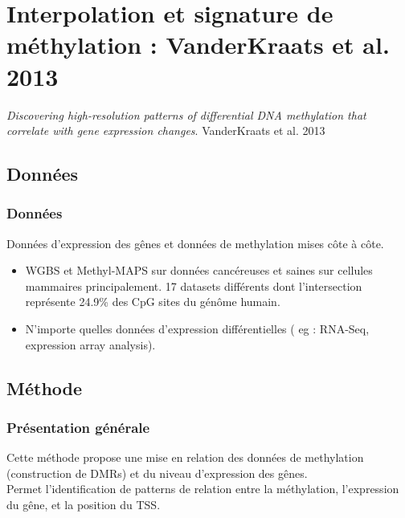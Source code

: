 \documentclass{beamer}
\begin{document}
\section{Interpolation et signature de méthylation : VanderKraats et al. 2013}
\begin{frame}
\begin{center}
\textit{Discovering high-resolution patterns of differential DNA methylation that correlate with gene expression changes}. VanderKraats et al. 2013
\end{center}
\end{frame}


\subsection{Données}
\begin{frame}
\frametitle{Données}
Données d'expression des gênes et données de methylation mises côte à côte.
\begin{itemize}
\item WGBS et Methyl-MAPS sur données cancéreuses et saines sur cellules mammaires principalement. 17 datasets différents dont l'intersection représente 24.9\% des CpG sites du génôme humain.
\item N'importe quelles données d'expression différentielles ( eg : RNA-Seq, expression array analysis).
\end{itemize}
\end{frame}

\subsection{Méthode}
\begin{frame}
\frametitle{Présentation générale}
Cette méthode propose une mise en relation des données de methylation (construction de DMRs) et du niveau d'expression des gênes. \\
Permet l'identification de patterns de relation entre la méthylation, l'expression du gêne, et la position du TSS.
\end{frame}
\end{document}

